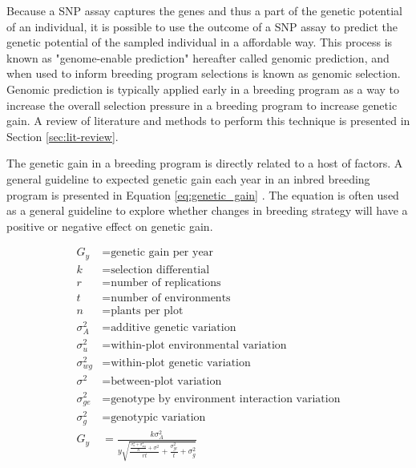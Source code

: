 Because a SNP assay captures the genes and thus a part of the genetic potential of an 
individual, it is possible to use the outcome of a SNP assay to predict the genetic
potential of the sampled individual in a affordable way. This process is known 
as "genome-enable prediction" hereafter called genomic prediction, and when used to inform breeding 
program selections is known as genomic selection. Genomic prediction is typically 
applied early in a breeding program as a way to increase the overall selection 
pressure in a breeding program to increase genetic gain. A review of literature
and methods to perform this technique is presented in Section \ref{sec:lit-review}. 

The genetic gain in a breeding program is directly related to a host of factors. A 
general guideline to expected genetic gain each year in an inbred breeding 
program is presented in Equation \ref{eq:genetic_gain} \citep{fehr1987}. The equation is
often used as a general guideline to explore whether changes in breeding strategy will
have a positive or negative effect on genetic gain. 

\begin{equation} \label{eq:genetic_gain}
\begin{split}
    G_y           &= \textrm{genetic gain per year} \\
    k             &= \textrm{selection differential} \\
    r             &= \textrm{number of replications} \\
    t             &= \textrm{number of environments} \\
    n             &= \textrm{plants per plot} \\
    \sigma^2_{A}  &= \textrm{additive genetic variation} \\
    \sigma^2_{u}  &= \textrm{within-plot environmental variation} \\
    \sigma^2_{wg} &= \textrm{within-plot genetic variation} \\
    \sigma^2      &= \textrm{between-plot variation} \\
    \sigma^2_{ge} &= \textrm{genotype by environment interaction variation} \\
    \sigma^2_{g}  &= \textrm{genotypic variation} \\
    G_y           &= \frac{k\sigma^2_A}{y \sqrt{ \frac{\frac{\sigma^2_{u} + \sigma^2_{wg}}{n} + \sigma^2}{rt} + \frac{\sigma^2_{ge}}{t} + \sigma^2_{g} }} \\
\end{split}
\end{equation}

